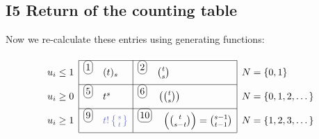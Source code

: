 \documentclass[12pt]{article}
\begin{document}
\subsection{I5 Return of the counting table}
Now we re-calculate these entries using generating functions:
\[\begin{array}[t]{l|l|l|l}
    \cline{2-3}
    u_i\leq 1 & {^{\circled{1}}\quad} (t)_s & {^{\circled{2}}\quad} {t\choose s}&N=\{0,1\}\\[6pt]\cline{2-3}
    u_i\geq 0 & {^{\circled{5}}\quad} t^s & {^{\circled{6}}\quad} \mchoose{t}{s} &N=\{0,1,2,\dots\}\\[6pt]\cline{2-3}
    u_i\geq 1 & {^{\circled{9}}\quad}\pt{t!\squig{s}{t}} & {^{\circled{10}}\quad}\mchoose{t}{s-t}={s-1\choose t-1}&N = \{1,2,3,\dots\}\\[6pt]\cline{2-3}
\end{array}\]
\end{document}
